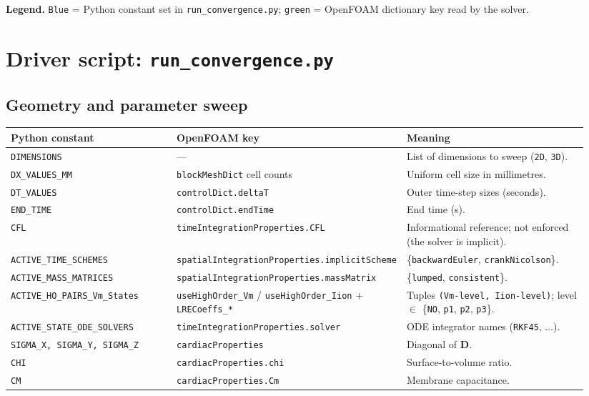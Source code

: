\documentclass[11pt,a4paper]{article}
\newcommand{\pyconst}[1]{\textcolor{black!60!blue}{\texttt{\footnotesize #1}}}
\newcommand{\dictkey}[1]{\textcolor{black!60!green}{\texttt{\footnotesize #1}}}
\newcommand{\Dten}{\mathbf{D}}
\newcommand{\code}[1]{\texttt{\small #1}}
\begin{document}
\noindent\textbf{Legend.} \pyconst{Blue} = Python constant set in
\code{run\_convergence.py}; \dictkey{green} = OpenFOAM dictionary key
read by the solver.

\section{Driver script: \texttt{run\_convergence.py}}
\label{sec:driver}

\subsection{Geometry and parameter sweep}
\begin{longtable}{@{}p{0.30\linewidth}p{0.28\linewidth}p{0.36\linewidth}@{}}
\toprule
Python constant & OpenFOAM key & Meaning \\
\midrule \endhead
\code{DIMENSIONS} & --- &
   List of dimensions to sweep (\code{2D}, \code{3D}). \\
\code{DX\_VALUES\_MM} & \code{blockMeshDict} cell counts &
   Uniform cell size in millimetres. \\
\code{DT\_VALUES} & \code{controlDict.deltaT} &
   Outer time-step sizes (seconds). \\
\code{END\_TIME} & \code{controlDict.endTime} & End time (s). \\
\code{CFL} & \code{timeIntegrationProperties.CFL} &
   Informational reference; not enforced (the solver is implicit). \\
\code{ACTIVE\_TIME\_SCHEMES} &
   \code{spatialIntegrationProperties.implicitScheme} &
   \{\code{backwardEuler}, \code{crankNicolson}\}. \\
\code{ACTIVE\_MASS\_MATRICES} &
   \code{spatialIntegrationProperties.massMatrix} &
   \{\code{lumped}, \code{consistent}\}. \\
\code{ACTIVE\_HO\_PAIRS\_Vm\_States} &
   \code{useHighOrder\_Vm} / \code{useHighOrder\_Iion}
   + \code{LRECoeffs\_*} &
   Tuples \texttt{(Vm-level, Iion-level)}; level $\in$
   \{\code{NO}, \code{p1}, \code{p2}, \code{p3}\}. \\
\code{ACTIVE\_STATE\_ODE\_SOLVERS} &
   \code{timeIntegrationProperties.solver} &
   ODE integrator names (\code{RKF45}, $\dots$). \\
\code{SIGMA\_X, SIGMA\_Y, SIGMA\_Z} & \code{cardiacProperties} &
   Diagonal of $\Dten$. \\
\code{CHI} & \code{cardiacProperties.chi} & Surface-to-volume ratio. \\
\code{CM} & \code{cardiacProperties.Cm} & Membrane capacitance. \\
\bottomrule
\end{longtable}
\end{document}

